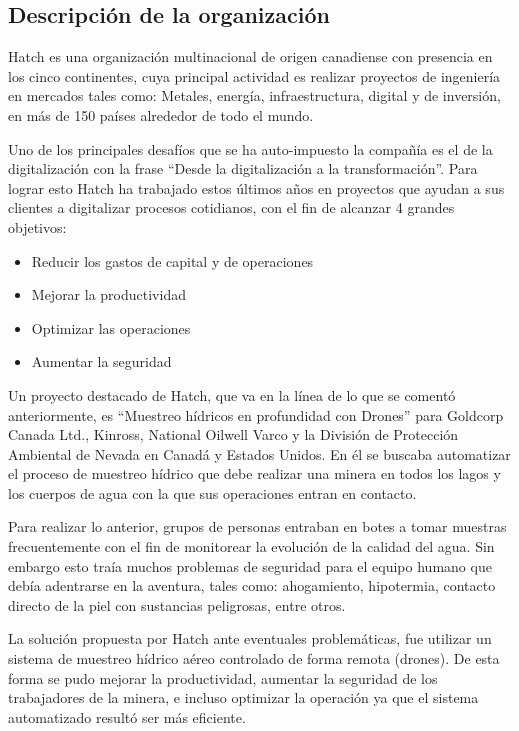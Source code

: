 \subsection{Descripción de la organización}
Hatch es una organización multinacional de origen canadiense con presencia en los cinco continentes, cuya principal actividad es realizar proyectos de ingeniería en mercados tales como: Metales, energía, infraestructura, digital y de inversión, en más de 150 países alrededor de todo el mundo.

Uno de los principales desafíos que se ha auto-impuesto la compañía es el de la digitalización con la frase “Desde la digitalización a la transformación”. Para lograr esto Hatch ha trabajado estos últimos años en proyectos que ayudan a sus clientes a digitalizar procesos cotidianos, con el fin de alcanzar 4 grandes objetivos:

\begin{itemize}
    \item Reducir los gastos de capital y de operaciones
    \item Mejorar la productividad
    \item Optimizar las operaciones
    \item Aumentar la seguridad
\end{itemize}

Un proyecto destacado de Hatch, que va en la línea de lo que se comentó anteriormente, es “Muestreo hídricos en profundidad con Drones” para Goldcorp Canada Ltd., Kinross, National Oilwell Varco y la División de Protección Ambiental de Nevada en Canadá y Estados Unidos. En él se buscaba automatizar el proceso de muestreo hídrico que debe realizar una minera en todos los lagos y los cuerpos de agua con la que sus operaciones entran en contacto. 

Para realizar lo anterior, grupos de personas entraban en botes a tomar muestras frecuentemente con el fin de monitorear la evolución de la calidad del agua. Sin embargo esto traía muchos problemas de seguridad para el equipo humano que debía adentrarse en la aventura, tales como: ahogamiento, hipotermia, contacto directo de la piel con sustancias peligrosas, entre otros. 

La solución propuesta por Hatch ante eventuales problemáticas, fue utilizar un sistema de muestreo hídrico aéreo controlado de forma remota (drones). De esta forma se pudo mejorar la productividad, aumentar la seguridad de los trabajadores de la minera, e incluso optimizar la operación ya que el sistema automatizado resultó ser más eficiente.

